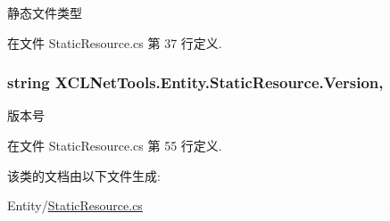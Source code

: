 静态文件类型 



在文件 Static\-Resource.\-cs 第 37 行定义.

\hypertarget{class_x_c_l_net_tools_1_1_entity_1_1_static_resource_a4b85a7d2f6dc6169a10ebfe2987f2404}{
\subsubsection[{Version}]{\setlength{\rightskip}{0pt plus 5cm}string X\-C\-L\-Net\-Tools.\-Entity.\-Static\-Resource.\-Version\hspace{0.3cm}{\ttfamily [get]}, {\ttfamily [set]}}}\label{class_x_c_l_net_tools_1_1_entity_1_1_static_resource_a4b85a7d2f6dc6169a10ebfe2987f2404}


版本号 



在文件 Static\-Resource.\-cs 第 55 行定义.



该类的文档由以下文件生成\-:\begin{DoxyCompactItemize}
\item 
Entity/\hyperlink{_static_resource_8cs}{Static\-Resource.\-cs}\end{DoxyCompactItemize}
